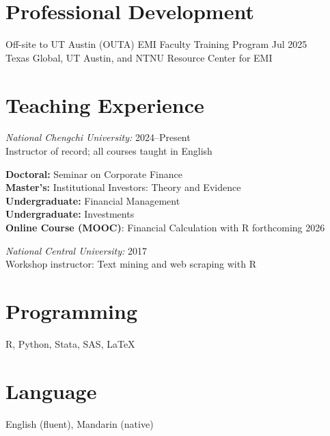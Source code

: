 \documentclass[
  english,
  margin]{res}
\begin{document}
\begin{resume}
\section{\texorpdfstring{Professional
\newline Development}{Professional Development}}\label{professional-development}

Off-site to UT Austin (OUTA) EMI Faculty Training Program \hfill Jul
2025\\
Texas Global, UT Austin, and NTNU Resource Center for EMI

\section{\texorpdfstring{Teaching
\newline Experience}{Teaching Experience}}\label{teaching-experience}

\emph{National Chengchi University:} \hfill 2024--Present\\
Instructor of record; all courses taught in English

\textbf{Doctoral:} Seminar on Corporate Finance\\
\textbf{Master's:} Institutional Investors: Theory and Evidence\\
\textbf{Undergraduate:} Financial Management\\
\textbf{Undergraduate:} Investments\\
\textbf{Online Course (MOOC)}: Financial Calculation with R
\hfill forthcoming 2026

\emph{National Central University:} \hfill 2017\\
Workshop instructor: Text mining and web scraping with R

\section{Programming}\label{programming}

R, Python, Stata, SAS, \LaTeX

\section{Language}\label{language}

English (fluent), Mandarin (native)

\end{resume}
\end{document}
